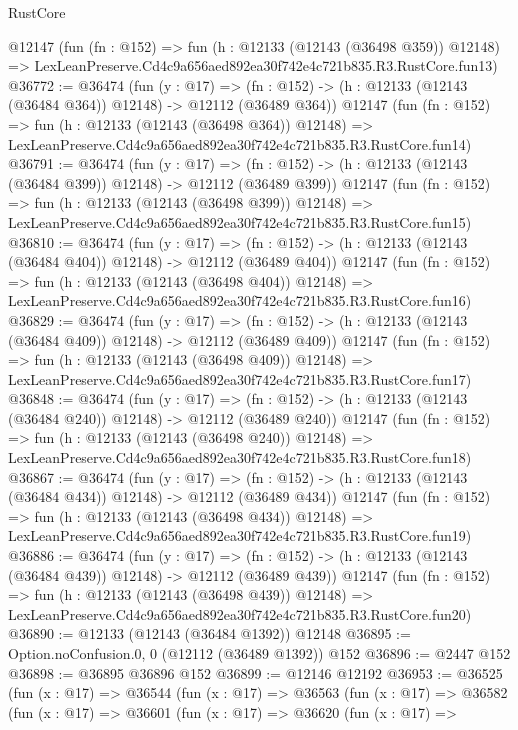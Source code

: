 \begin{lexlean}{RustCore}
\begin{coremodule}
    @12147
    (fun (fn : @152) =>
    fun (h : @12133 (@12143 (@36498 @359)) @12148) =>
    LexLeanPreserve.Cd4c9a656aed892ea30f742e4c721b835.R3.RustCore.fun13)
@36772 := @36474
    (fun (y : @17) =>
    (fn : @152) -> (h : @12133 (@12143 (@36484 @364)) @12148) -> @12112 (@36489 @364))
    @12147
    (fun (fn : @152) =>
    fun (h : @12133 (@12143 (@36498 @364)) @12148) =>
    LexLeanPreserve.Cd4c9a656aed892ea30f742e4c721b835.R3.RustCore.fun14)
@36791 := @36474
    (fun (y : @17) =>
    (fn : @152) -> (h : @12133 (@12143 (@36484 @399)) @12148) -> @12112 (@36489 @399))
    @12147
    (fun (fn : @152) =>
    fun (h : @12133 (@12143 (@36498 @399)) @12148) =>
    LexLeanPreserve.Cd4c9a656aed892ea30f742e4c721b835.R3.RustCore.fun15)
@36810 := @36474
    (fun (y : @17) =>
    (fn : @152) -> (h : @12133 (@12143 (@36484 @404)) @12148) -> @12112 (@36489 @404))
    @12147
    (fun (fn : @152) =>
    fun (h : @12133 (@12143 (@36498 @404)) @12148) =>
    LexLeanPreserve.Cd4c9a656aed892ea30f742e4c721b835.R3.RustCore.fun16)
@36829 := @36474
    (fun (y : @17) =>
    (fn : @152) -> (h : @12133 (@12143 (@36484 @409)) @12148) -> @12112 (@36489 @409))
    @12147
    (fun (fn : @152) =>
    fun (h : @12133 (@12143 (@36498 @409)) @12148) =>
    LexLeanPreserve.Cd4c9a656aed892ea30f742e4c721b835.R3.RustCore.fun17)
@36848 := @36474
    (fun (y : @17) =>
    (fn : @152) -> (h : @12133 (@12143 (@36484 @240)) @12148) -> @12112 (@36489 @240))
    @12147
    (fun (fn : @152) =>
    fun (h : @12133 (@12143 (@36498 @240)) @12148) =>
    LexLeanPreserve.Cd4c9a656aed892ea30f742e4c721b835.R3.RustCore.fun18)
@36867 := @36474
    (fun (y : @17) =>
    (fn : @152) -> (h : @12133 (@12143 (@36484 @434)) @12148) -> @12112 (@36489 @434))
    @12147
    (fun (fn : @152) =>
    fun (h : @12133 (@12143 (@36498 @434)) @12148) =>
    LexLeanPreserve.Cd4c9a656aed892ea30f742e4c721b835.R3.RustCore.fun19)
@36886 := @36474
    (fun (y : @17) =>
    (fn : @152) -> (h : @12133 (@12143 (@36484 @439)) @12148) -> @12112 (@36489 @439))
    @12147
    (fun (fn : @152) =>
    fun (h : @12133 (@12143 (@36498 @439)) @12148) =>
    LexLeanPreserve.Cd4c9a656aed892ea30f742e4c721b835.R3.RustCore.fun20)
@36890 := @12133 (@12143 (@36484 @1392)) @12148
@36895 := Option.noConfusion.{0, 0} (@12112 (@36489 @1392)) @152
@36896 := @2447 @152
@36898 := @36895 @36896 @152
@36899 := @12146 @12192
@36953 := @36525
    (fun (x : @17) =>
    @36544
      (fun (x : @17) =>
      @36563
        (fun (x : @17) =>
        @36582
          (fun (x : @17) =>
          @36601
            (fun (x : @17) =>
            @36620
              (fun (x : @17) =>

\end{coremodule}
\end{lexlean}
